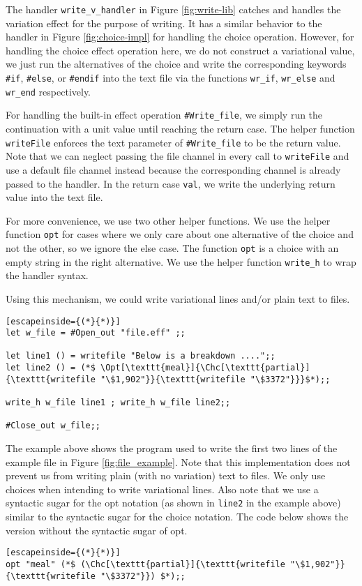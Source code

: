 The handler \texttt{write\_v\_handler} in Figure \ref{fig:write-lib} catches and handles the variation effect for the purpose of writing. It has a similar behavior to the handler in Figure \ref{fig:choice-impl} for handling the choice operation. However, for handling the choice effect operation here, we do not construct a variational value, we just run the alternatives of the choice and write the corresponding keywords \texttt{\#if}, \texttt{\#else}, or \texttt{\#endif} into the text file via the functions \texttt{wr\_if}, \texttt{wr\_else} and \texttt{wr\_end} respectively. 

For handling the built-in effect operation \texttt{\#Write\_file}, we simply run the continuation with a unit value until reaching the return case. The helper function \texttt{writeFile} enforces the text parameter of \texttt{\#Write\_file} to be the return value. Note that we can neglect passing the file channel in every call to \texttt{writeFile} and use a default file channel instead because the corresponding channel is already passed to the handler. In the return case \texttt{val}, we write the underlying return value into the text file. 

For more convenience, we use two other helper functions. We use the helper function \texttt{opt} for cases where we only care about one alternative of the choice and not the other, so we ignore the else case. The function \texttt{opt} is a choice with an empty string in the right alternative. We use the helper function \texttt{write\_h} to wrap the handler syntax.

Using this mechanism, we could write variational lines and/or plain text to files.

\begin{lstlisting}[escapeinside={(*}{*)}]
let w_file = #Open_out "file.eff" ;;

let line1 () = writefile "Below is a breakdown ....";;
let line2 () = (*$ \Opt[\texttt{meal}]{\Chc[\texttt{partial}]{\texttt{writefile "\$1,902"}}{\texttt{writefile "\$3372"}}}$*);;

write_h w_file line1 ; write_h w_file line2;;

#Close_out w_file;;
\end{lstlisting}
%
The example above shows the program used to write the first two lines of the example file in Figure \ref{fig:file_example}. Note that this implementation does not prevent us from writing plain (with no variation) text to files. We only use choices when intending to write variational lines.  Also note that we use a syntactic sugar for the opt notation (as shown in \texttt{line2} in the example above) similar to the syntactic sugar for the choice notation. The code below shows the version without the syntactic sugar of opt. 
%
\begin{lstlisting}[escapeinside={(*}{*)}]
opt "meal" (*$ (\Chc[\texttt{partial}]{\texttt{writefile "\$1,902"}}{\texttt{writefile "\$3372"}}) $*);;
\end{lstlisting}